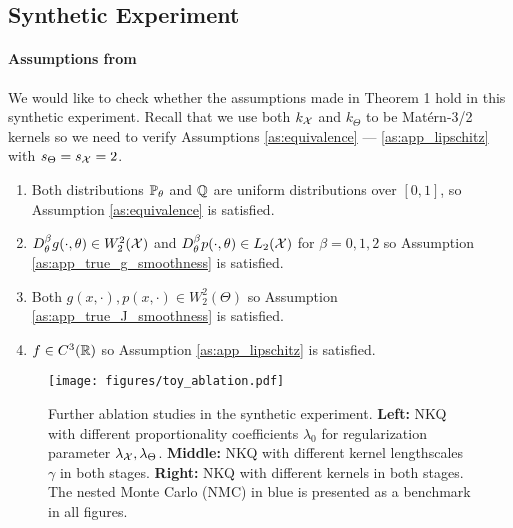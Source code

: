 \subsection{Synthetic Experiment}\label{sec:appendix_toy}
\paragraph{Assumptions from }
We would like to check whether the assumptions made in Theorem 1 hold in this synthetic experiment. Recall that we use both $k_{\mathcal{X}}$ and $k_\Theta$ to be Mat\'{e}rn-3/2 kernels so we need to verify Assumptions \ref{as:equivalence} --- \ref{as:app_lipschitz} with $s_\Theta=s_{\mathcal{X}}=2$.
\begin{enumerate}
    \item Both distributions $\mathbb{P}_\theta$ and $\mathbb{Q}$ are uniform distributions over $[0,1]$, so Assumption \ref{as:equivalence} is satisfied.
    \item $D_\theta^{\beta} g(\cdot, \theta) \in W_2^2(\mathcal{X})$ and $D_\theta^{\beta} p(\cdot, \theta) \in L_2(\mathcal{X})$ for $\beta = 0, 1, 2$ so Assumption \ref{as:app_true_g_smoothness} is satisfied.
    \item Both $g(x, \cdot), p(x, \cdot) \in W_2^{2}(\Theta)$ so Assumption \ref{as:app_true_J_smoothness} is satisfied.
    \item $f \in C^{3}(\mathbb{R})$ so Assumption \ref{as:app_lipschitz} is satisfied.
\end{enumerate}

\begin{figure}[t]
    \centering
    \texttt{[image: figures/toy\_ablation.pdf]}
    \caption{Further ablation studies in the synthetic experiment. \textbf{Left:} NKQ with different proportionality coefficients $\lambda_0$ for regularization parameter $\lambda_{\mathcal{X}}, \lambda_\Theta$. 
    \textbf{Middle:} NKQ with different kernel lengthscales $\gamma$ in both stages. 
    \textbf{Right:} NKQ with different kernels in both stages. The nested Monte Carlo (NMC) in blue is presented as a benchmark in all figures.}
    \label{fig:toy-ablation}
    \vspace{-10pt}
\end{figure}

